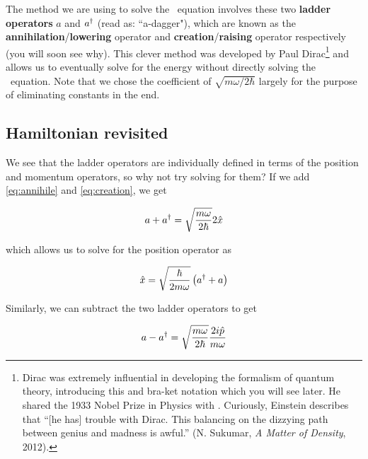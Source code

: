 The method we are using to solve the \Sch\ equation involves these two \textbf{ladder operators} $a$ and $a^{\dagger}$ (read as: ``a-dagger"), which are known as the \textbf{annihilation}/\textbf{lowering} operator and \textbf{creation}/\textbf{raising} operator respectively (you will soon see why). 
This clever method was developed by Paul Dirac\footnote{Dirac was extremely influential in developing the formalism of quantum theory, introducing this and bra-ket notation which you will see later. He shared the 1933 Nobel Prize in Physics with \Sch. Curiously, Einstein describes that ``[he has] trouble with Dirac. This balancing on the dizzying path between genius and madness is awful.'' (N. Sukumar, \emph{A Matter of Density}, 2012).} and allows us to eventually solve for the energy without directly solving the \Sch\ equation. 
Note that we chose the coefficient of $\sqrt{m\omega/2\hbar}$ largely for the purpose of eliminating constants in the end.


\subsection{Hamiltonian revisited}

We see that the ladder operators are individually defined in terms of the position and momentum operators, so why not try solving for them? 
If we add \autoref{eq:annihile} and \ref{eq:creation}, we get 

\begin{equation*}
	a + a^{\dagger} = \sqrt{\frac{m\omega}{2\hbar}}2\hat{x}
\end{equation*}

\noindent which allows us to solve for the position operator as

\begin{tcolorbox}[title = Position operator] \vspace{-2ex}
	\begin{equation}
		\hat{x} = \sqrt{\frac{\hbar}{2m\omega}}\left(a^{\dagger} + a \right) \label{eq:x-op}
	\end{equation}
\end{tcolorbox}

Similarly, we can subtract the two ladder operators to get

\begin{equation*}
	a - a^{\dagger} = \sqrt{\frac{m\omega}{2\hbar}} \frac{2i\hat{p}}{m\omega}
\end{equation*}

